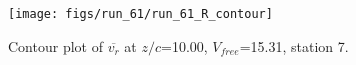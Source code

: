 \begin{figure}[H]
\centering
\texttt{[image: figs/run\_61/run\_61\_R\_contour]}
\caption{Contour plot of $\overline{v_{r}}$ at $z/c$=10.00, $V_{free}$=15.31, station 7.}
\label{fig:run_61_R_contour}
\end{figure}


